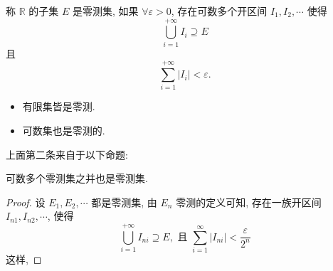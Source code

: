 \begin{definition}
  称 $\mathbb{R}$ 的子集 $E$ 是零测集, 如果 $\forall \varepsilon > 0$, 存在可数多个开区间 $I_1, I_2, \cdots$ 使得 
  \begin{equation}
    \bigcup_{i=1}^{+ \infty} I_i \supseteq E
  \end{equation}
  且
  \begin{equation}
    \sum_{i=1}^{+ \infty} \left| I_i \right| < \varepsilon. 
  \end{equation}
\end{definition}

\begin{example}
  \begin{itemize}
    \noindent
    \item 有限集皆是零测. 
    \item 可数集也是零测的.
  \end{itemize}
\end{example}

上面第二条来自于以下命题:
\begin{proposition}
  可数多个零测集之并也是零测集.
\end{proposition}
\begin{proof}
  设 $E_1, E_2, \cdots $ 都是零测集, 由 $E_n$ 零测的定义可知, 存在一族开区间 $I_{n 1}, I_{n 2}, \cdots $, 使得
  \begin{equation}
    \bigcup_{i=1}^{+\infty } I_{n i} \supseteq E, \text{ 且 } \sum_{i=1}^{\infty }  \left| I_{ni} \right| < \frac{\varepsilon}{2^{n}}
  \end{equation}
  这样, 
\end{proof}
